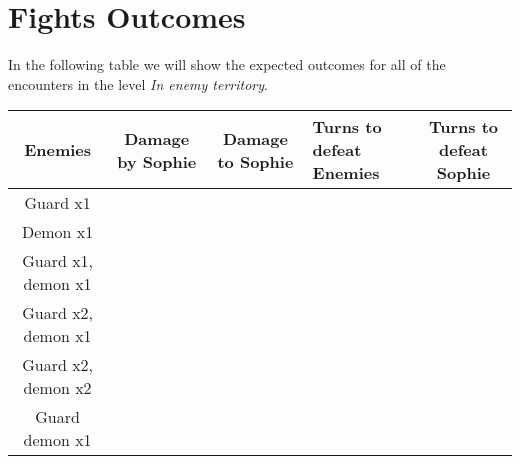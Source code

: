 \section{Fights Outcomes}
In the following table we will show the expected outcomes for all of the encounters in the level \textit{In enemy territory}.
\begin{table}[H]
\begin{tabular}{|c|l|l|l|l|}
\hline
\rowcolor[HTML]{C0C0C0} 
\textbf{Enemies} & \multicolumn{1}{c|}{\cellcolor[HTML]{C0C0C0}\textbf{Damage by Sophie}} & \multicolumn{1}{c|}{\cellcolor[HTML]{C0C0C0}\textbf{Damage to Sophie}} & \textbf{Turns to defeat Enemies} & \multicolumn{1}{c|}{\cellcolor[HTML]{C0C0C0}\textbf{Turns to defeat Sophie}} \\ \hline
Guard x1 &  &  &  &  \\ \hline
Demon x1 &  &  &  &  \\ \hline
Guard x1, demon x1 &  &  &  &  \\ \hline
Guard x2, demon x1 &  &  &  &  \\ \hline
Guard x2, demon x2 &  &  &  &  \\ \hline
Guard demon x1 &  &  &  &  \\ \hline
\end{tabular}
\end{table}
